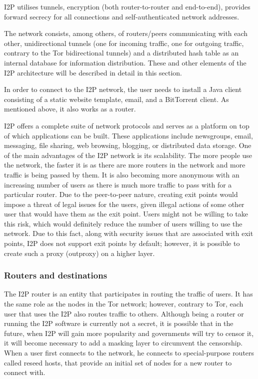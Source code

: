 I2P utilises tunnels, encryption (both router-to-router and end-to-end), provides forward secrecy for all connections and self-authenticated network addresses.

The network consists, among others, of routers/peers communicating with each other, unidirectional tunnels (one for incoming traffic, one for outgoing traffic, contrary to the Tor bidirectional tunnels) and a distributed hash table as an internal database for information distribution. These and other elements of the I2P architecture will be described in detail in this section.

In order to connect to the I2P network, the user needs to install a Java client consisting of a static website template, email, and a BitTorrent client. As mentioned above, it also works as a router.

I2P offers a complete suite of network protocols and serves as a platform on top of which applications can be built. These applications include newsgroups, email, messaging, file sharing, web browsing, blogging, or distributed data storage.
One of the main advantages of the I2P network is its scalability. The more people use the network, the faster it is as there are more routers in the network and more traffic is being passed by them. It is also becoming more anonymous with an increasing number of users as there is much more traffic to pass with for a particular router. Due to the peer-to-peer nature, creating exit points would impose a threat of legal issues for the users, given illegal actions of some other user that would have them as the exit point. Users might not be willing to take this risk, which would definitely reduce the number of users willing to use the network. Due to this fact, along with security issues that are associated with exit points, I2P does not support exit points by default; however, it is possible to create such a proxy (outproxy) on a higher layer.

\subsubsection{Routers and destinations}
The I2P router is an entity that participates in routing the traffic of users. It has the same role as the nodes in the Tor network; however, contrary to Tor, each user that uses the I2P also routes traffic to others. Although being a router or running the I2P software is currently not a secret, it is possible that in the future, when I2P will gain more popularity and governments will try to censor it, it will become necessary to add a masking layer to circumvent the censorship. When a user first connects to the network, he connects to special-purpose routers called reseed hosts, that provide an initial set of nodes for a new router to connect with.

